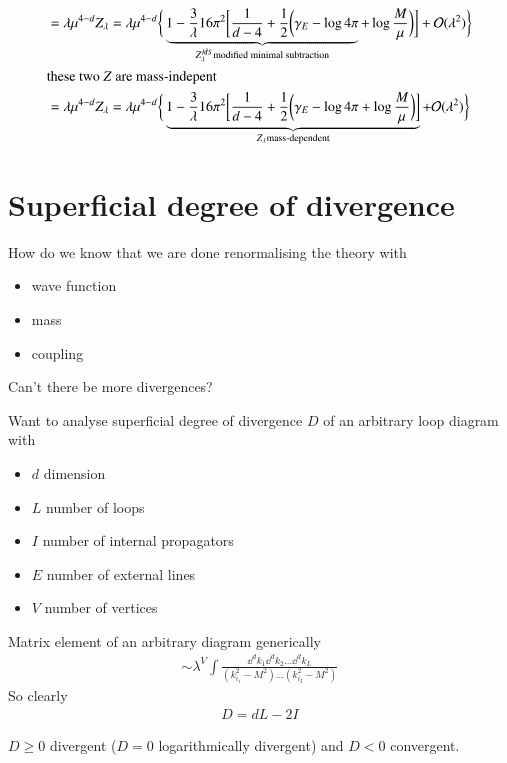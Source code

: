 \begin{itemize}
\begin{align*}
			&=  \lambda \mu^{4-d}Z_\lambda = \lambda \mu^{4-d} \bigg\{ \underbrace{1- \frac{3}{\lambda}{16\pi^2} \bigg[ \frac{1}{d-4} +\frac{1}{2} \bigg(\gamma_E -\log{4\pi} }_{Z^{\bar{MS}}_\lambda \text{modified minimal subtraction}} + \log{\frac{M}{\mu}}\bigg)\bigg] + \mathcal{O}(\lambda^2) \bigg\} \\
			\shortintertext{\text{these two $Z$ are mass-indepent}}
			&=  \lambda \mu^{4-d}Z_\lambda = \lambda \mu^{4-d} \bigg\{ \underbrace{1- \frac{3}{\lambda}{16\pi^2} \bigg[ \frac{1}{d-4} +\frac{1}{2} \bigg(\gamma_E -\log{4\pi}  + \log{\frac{M}{\mu}}\bigg)\bigg] }_{Z_\lambda \text{mass-dependent}}+ \mathcal{O}(\lambda^2) \bigg\} 
		\end{align*}
\end{itemize}

\section{Superficial degree of divergence}
How do we know that we are done renormalising the theory with
\begin{itemize}
	\item wave function
	\item mass
	\item coupling
\end{itemize}
Can't there be more divergences?

Want to analyse superficial degree of divergence $D$ of an arbitrary loop diagram with 
\begin{itemize}
	\item $d$ dimension
	\item $L$ number of loops
	\item $I$ number of internal propagators
	\item $E$ number of external lines
	\item $V$ number of vertices
\end{itemize}

Matrix element of an arbitrary diagram generically 
\begin{align*}
	\sim \lambda^V \int \frac{\dd^d k_1 \dd^d k_2 \dots \dd^d k_L}{(k_{i_1}^2 - M^2) \dots (k_{i_I}^2 - M^2)}
\end{align*}
So clearly 
\begin{align}
	D = d L - 2 I
\end{align}

$D \geq 0 $ divergent ($D=0$ logarithmically divergent) and $D < 0$ convergent.

